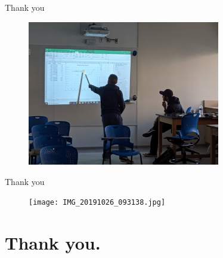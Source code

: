 \documentclass{beamer}
\begin{document}
\begin{frame}{Thank you}
\begin{figure}
\centering
\includegraphics[width=0.75\textwidth]{IMG_20191113_153800.jpg}
\end{figure}
\end{frame}

\begin{frame}{Thank you}
\begin{figure}
\centering
\texttt{[image: IMG\_20191026\_093138.jpg]}
\end{figure}
\end{frame}

\section{Thank you.}
\end{document}
